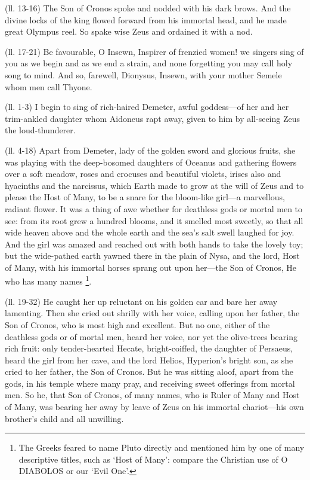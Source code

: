 (ll. 13-16) The Son of Cronos spoke and nodded with his dark brows. And the
divine locks of the king flowed forward from his immortal head, and he made
great Olympus reel. So spake wise Zeus and ordained it with a nod.

(ll. 17-21) Be favourable, O Insewn, Inspirer of frenzied women! we singers
sing of you as we begin and as we end a strain, and none forgetting you may
call holy song to mind. And so, farewell, Dionysus, Insewn, with your mother
Semele whom men call Thyone.


(ll. 1-3) I begin to sing of rich-haired Demeter, awful goddess—of her
and her trim-ankled daughter whom Aidoneus rapt away, given to him by
all-seeing Zeus the loud-thunderer.

(ll. 4-18) Apart from Demeter, lady of the golden sword and glorious fruits,
she was playing with the deep-bosomed daughters of Oceanus and gathering
flowers over a soft meadow, roses and crocuses and beautiful violets, irises
also and hyacinths and the narcissus, which Earth made to grow at the will of
Zeus and to please the Host of Many, to be a snare for the bloom-like
girl—a marvellous, radiant flower. It was a thing of awe whether for
deathless gods or mortal men to see: from its root grew a hundred blooms, and
it smelled most sweetly, so that all wide heaven above and the whole earth and
the sea’s salt swell laughed for joy. And the girl was amazed and reached
out with both hands to take the lovely toy; but the wide-pathed earth yawned
there in the plain of Nysa, and the lord, Host of Many, with his immortal
horses sprang out upon her—the Son of Cronos, He who has many names \footnote{The Greeks feared to name
Pluto directly and mentioned him by one of many descriptive titles, such as
‘Host of Many’: compare the Christian use of O DIABOLOS or our
‘Evil One’.}.

(ll. 19-32) He caught her up reluctant on his golden car and bare her away
lamenting. Then she cried out shrilly with her voice, calling upon her father,
the Son of Cronos, who is most high and excellent. But no one, either of the
deathless gods or of mortal men, heard her voice, nor yet the olive-trees
bearing rich fruit: only tender-hearted Hecate, bright-coiffed, the daughter of
Persaeus, heard the girl from her cave, and the lord Helios, Hyperion’s
bright son, as she cried to her father, the Son of Cronos. But he was sitting
aloof, apart from the gods, in his temple where many pray, and receiving sweet
offerings from mortal men. So he, that Son of Cronos, of many names, who is
Ruler of Many and Host of Many, was bearing her away by leave of Zeus on his
immortal chariot—his own brother’s child and all unwilling.

